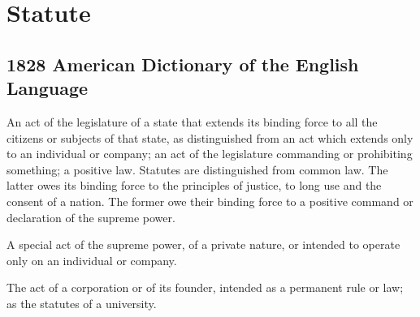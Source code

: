 \section{Statute}
	\label{STATUTE}
	

\subsection{1828 American Dictionary of the English Language} %
	\label{STATUTE-1828}

	\begin{compactitem}
		\item[1] An act of the legislature of a state that extends its binding force to all the citizens or subjects of that state, as distinguished from an act which extends only to an individual or company; an act of the legislature commanding or prohibiting something; a positive law. Statutes are distinguished from common law. The latter owes its binding force to the principles of justice, to long use and the consent of a nation. The former owe their binding force to a positive command or declaration of the supreme power.
		\item[2]  A special act of the supreme power, of a private nature, or intended to operate only on an individual or company.
		\item[3] The act of a corporation or of its founder, intended as a permanent rule or law; as the statutes of a university.
	\end{compactitem}



